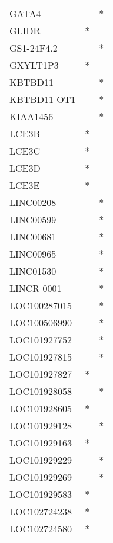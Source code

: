\begin{longtable}{lcc}
GATA4        &                &          * \\
GLIDR        &              * &            \\
GS1-24F4.2   &                &          * \\
GXYLT1P3     &              * &            \\
KBTBD11      &                &          * \\
KBTBD11-OT1  &                &          * \\
KIAA1456     &                &          * \\
LCE3B        &              * &            \\
LCE3C        &              * &            \\
LCE3D        &              * &            \\
LCE3E        &              * &            \\
LINC00208    &                &          * \\
LINC00599    &                &          * \\
LINC00681    &                &          * \\
LINC00965    &                &          * \\
LINC01530    &                &          * \\
LINCR-0001   &                &          * \\
LOC100287015 &                &          * \\
LOC100506990 &                &          * \\
LOC101927752 &                &          * \\
LOC101927815 &                &          * \\
LOC101927827 &              * &            \\
LOC101928058 &                &          * \\
LOC101928605 &              * &            \\
LOC101929128 &                &          * \\
LOC101929163 &              * &            \\
LOC101929229 &                &          * \\
LOC101929269 &                &          * \\
LOC101929583 &              * &            \\
LOC102724238 &              * &            \\
LOC102724580 &              * &            \\

\end{longtable}
